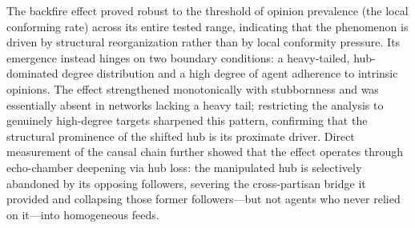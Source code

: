 \documentclass[pdflatex,sn-mathphys-num]{sn-jnl}%
\theoremstyle{thmstyleone}%
\theoremstyle{thmstyletwo}%
\theoremstyle{thmstylethree}%
\begin{document}
The backfire effect proved robust to the threshold of opinion prevalence (the
local conforming rate) across its entire tested range, indicating that the
phenomenon is driven by structural reorganization rather than by local conformity
pressure. Its emergence instead hinges on two boundary conditions: a heavy-tailed,
hub-dominated degree distribution and a high degree of agent adherence to
intrinsic opinions. The effect strengthened monotonically with stubbornness and
was essentially absent in networks lacking a heavy tail; 
restricting the analysis to genuinely high-degree targets
sharpened this pattern, confirming that the structural prominence of the shifted
hub is its proximate driver. Direct measurement of the causal chain further showed
that the effect operates through echo-chamber deepening via hub loss: the
manipulated hub is selectively abandoned by its opposing followers, severing the
cross-partisan bridge it provided and collapsing those former followers---but not
agents who never relied on it---into homogeneous feeds.
\par
\end{document}
